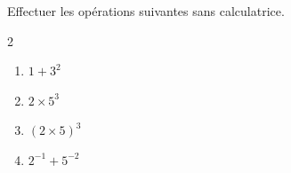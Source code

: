 \begin{exo}{}
	Effectuer les opérations suivantes sans calculatrice.
	\vspace*{-2mm}\begin{multicols}{2}
		\begin{enumerate}[itemsep=2mm]
			\item $1 + 3^2$
			\item $2 \times 5^3$
			\item $(2 \times 5)^3$
			\item $2^{-1} + 5^{-2}$
		\end{enumerate}
	\end{multicols}
\end{exo}

